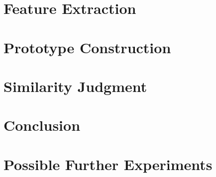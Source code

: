 \documentclass[conference]{IEEEtran}
\begin{document}
\section{Feature Extraction}
\section{Prototype Construction}
\section{Similarity Judgment}


\section{Conclusion}
\section{Possible Further Experiments}
%
\end{document}
